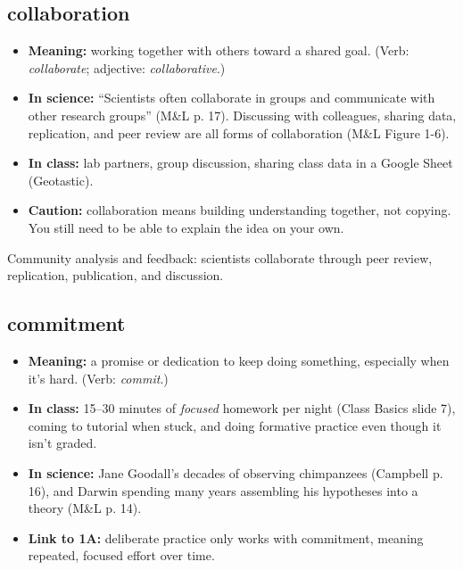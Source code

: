 \documentclass[11pt,letterpaper]{article}
\begin{document}
\subsection{collaboration}
\begin{itemize}
  \item \textbf{Meaning:} working together with others toward a shared goal. (Verb: \emph{collaborate}; adjective: \emph{collaborative}.)
  \item \textbf{In science:} ``Scientists often collaborate in groups and communicate with other research groups'' (M\&L p. 17). Discussing with colleagues, sharing data, replication, and peer review are all forms of collaboration (M\&L Figure 1-6).
  \item \textbf{In class:} lab partners, group discussion, sharing class data in a Google Sheet (Geotastic).
  \item \textbf{Caution:} collaboration means building understanding together, not copying. You still need to be able to explain the idea on your own.
\end{itemize}

  {Community analysis and feedback: scientists collaborate through peer review, replication, publication, and discussion.}

\subsection{commitment}
\begin{itemize}
  \item \textbf{Meaning:} a promise or dedication to keep doing something, especially when it's hard. (Verb: \emph{commit}.)
  \item \textbf{In class:} 15–30 minutes of \emph{focused} homework per night (Class Basics slide 7), coming to tutorial when stuck, and doing formative practice even though it isn't graded.
  \item \textbf{In science:} Jane Goodall's decades of observing chimpanzees (Campbell p. 16), and Darwin spending many years assembling his hypotheses into a theory (M\&L p. 14).
  \item \textbf{Link to 1A:} deliberate practice only works with commitment, meaning repeated, focused effort over time.
\end{itemize}
\end{document}
